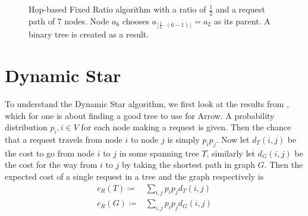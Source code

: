 \documentclass[a4paper, oneside]{discothesis}
\begin{document}
\begin{figure}
\centering
{}
\caption{Hop-based Fixed Ratio algorithm with a ratio of $\frac{1}{2}$ and a request path of 7 nodes. Node $a_{6}$ chooses $a_{\lfloor \frac{1}{2}\cdot(6-1) \rfloor}=a_{2}$ as its parent. A binary tree is created as a result.}
\label{fig:fpr}
\end{figure}

\section{Dynamic Star}
\label{dynstar}

To understand the Dynamic Star algorithm, we first look at the results from \cite{Peleg}, which for one is about finding a good tree to use for Arrow. A probability distribution $p_i, i\in V$ for each node making a request is given. Then the chance that a request travels from node $i$ to node $j$ is simply $p_ip_j$. Now let $d_T(i,j)$ be the cost to go from node $i$ to $j$ in some spanning tree $T$, similarly let $d_G(i,j)$ be the cost for the way from $i$ to $j$ by taking the shortest path in graph $G$. Then the expected cost of a single request in a tree and the graph respectively is
\begin{equation}
\begin{split}
c_R(T)\coloneqq & \sum_{i,j}p_ip_jd_T(i,j) \\
c_R(G)\coloneqq & \sum_{i,j}p_ip_jd_G(i,j) \\
\end{split}
\end{equation}
\end{document}
